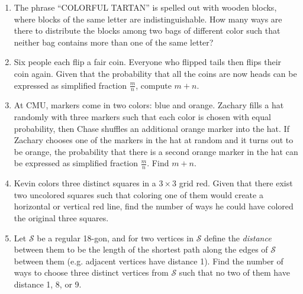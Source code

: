 \documentclass[10pt]{article}
\begin{document}
\begin{enumerate}
\setlength{\itemsep}{5pt}

\item The phrase ``COLORFUL TARTAN'' is spelled out with wooden blocks, where blocks of the same letter are indistinguishable. How many ways are there to distribute the blocks among two bags of different color such that neither bag contains more than one of the same letter?

\item Six people each flip a fair coin. Everyone who flipped tails then flips their coin again. Given that the probability that all the coins are now heads can be expressed as simplified fraction $\tfrac{m}{n}$, compute $m+n$. %


\item At CMU, markers come in two colors: blue and orange. Zachary fills a hat randomly with three markers such that each color is chosen with equal probability, then Chase shuffles an additional orange marker into the hat. If Zachary chooses one of the markers in the hat at random and it turns out to be orange, the probability that there is a second orange marker in the hat can be expressed as simplified fraction $\tfrac{m}{n}$. Find $m+n$. %

\item Kevin colors three distinct squares in a $3\times 3$ grid red. Given that there exist two uncolored squares such that coloring one of them would create a horizontal or vertical red line, find the number of ways he could have colored the original three squares. %


\item Let $\mathcal{S}$ be a regular 18-gon, and for two vertices in $\mathcal{S}$ define the \textit{distance} between them to be the length of the shortest path along the edges of $\mathcal{S}$ between them (e.g. adjacent vertices have distance 1). Find the number of ways to choose three distinct vertices from $\mathcal{S}$ such that no two of them have distance 1, 8, or 9.


\end{enumerate}
\end{document}
